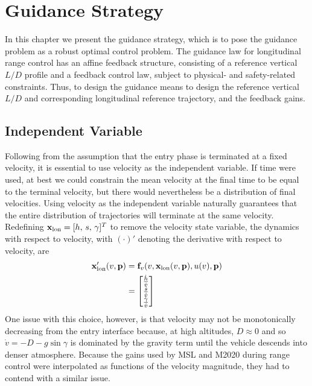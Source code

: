 \chapter{Guidance Strategy}\label{Ch:GuidanceStrategy}
In this chapter we present the guidance strategy, which is to pose the guidance problem as a robust optimal control problem. 
The guidance law for longitudinal range control has an affine feedback structure, consisting of a reference vertical $L/D$ profile and a feedback control law, subject to physical- and safety-related constraints. Thus, to design the guidance means to design the reference vertical $L/D$ and corresponding longitudinal reference trajectory, and the feedback gains. 
%

\section{Independent Variable}
Following from the assumption that the entry phase is terminated at a fixed velocity, it is essential to use velocity as the independent variable. If time were used, at best we could constrain the mean velocity at the final time to be equal to the terminal velocity, but there would nevertheless be a distribution of final velocities. Using velocity as the independent variable naturally guarantees that the entire distribution of trajectories will terminate at the same velocity.
Redefining $\mathbf{x}_{\mathrm{lon}} = [h,\,s,\,\gamma]^T$ to remove the velocity state variable, the dynamics with respect to velocity, with $ (\cdot)' $ denoting the derivative with respect to velocity, are 
\begin{align}
	\mathbf{x}_{\mathrm{lon}}'(v,\mathbf{p}) &= \mathbf{f}_v(v,\mathbf{x}_{\mathrm{lon}}(v,\mathbf{p}),u(v),\mathbf{p}) \label{Eq:DynamicsWRTVel}\\
	&= \begin{bmatrix}
		\frac{\dot{h}}{\dot{v}} \\
		\frac{\dot{s}}{\dot{v}} \\
		\frac{\dot{\gamma}}{\dot{v}} 
	\end{bmatrix}
\end{align}
One issue with this choice, however, is that velocity may not be monotonically decreasing from the entry interface because, at high altitudes, $D\approx0$ and so $\dot{v}=-D-g\sin\gamma$ is dominated by the gravity term until the vehicle descends into denser atmosphere. Because the gains used by MSL and M2020 during range control were interpolated as functions of the velocity magnitude, they had to contend with a similar issue.

